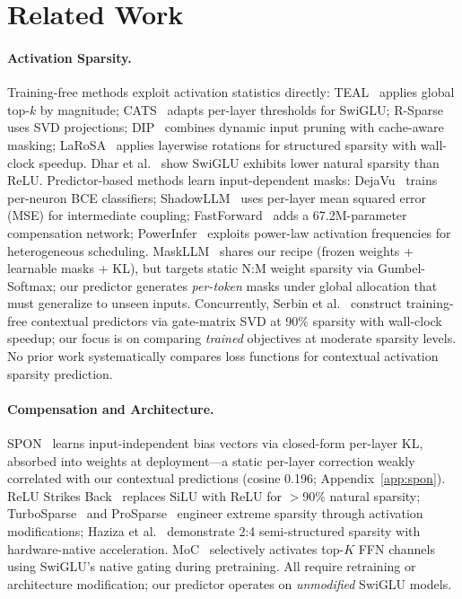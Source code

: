 \section{Related Work}

\paragraph{Activation Sparsity.}
Training-free methods exploit activation statistics directly: TEAL~\cite{liu2025teal} applies global top-$k$ by magnitude; CATS~\cite{lee2024cats} adapts per-layer thresholds for SwiGLU; R-Sparse~\cite{zhang2025rsparse} uses SVD projections; DIP~\cite{federici2025dip} combines dynamic input pruning with cache-aware masking; LaRoSA~\cite{liu2025larosa} applies layerwise rotations for structured sparsity with wall-clock speedup.
Dhar et al.~\cite{dhar2024activation} show SwiGLU exhibits lower natural sparsity than ReLU.
Predictor-based methods learn input-dependent masks: DejaVu~\cite{liu2023dejavu} trains per-neuron BCE classifiers; ShadowLLM~\cite{akhauri2024shadowllm} uses per-layer mean squared error (MSE) for intermediate coupling; FastForward~\cite{gautam2026fastforward} adds a 67.2M-parameter compensation network; PowerInfer~\cite{song2024powerinfer} exploits power-law activation frequencies for heterogeneous scheduling.
MaskLLM~\cite{fang2024maskllm} shares our recipe (frozen weights + learnable masks + KL), but targets static N:M weight sparsity via Gumbel-Softmax; our predictor generates \emph{per-token} masks under global allocation that must generalize to unseen inputs.
Concurrently, Serbin et al.~\cite{serbin2026svdcsp} construct training-free contextual predictors via gate-matrix SVD at 90\% sparsity with wall-clock speedup; our focus is on comparing \emph{trained} objectives at moderate sparsity levels.
No prior work systematically compares loss functions for contextual activation sparsity prediction.

\paragraph{Compensation and Architecture.}
SPON~\cite{xu2025spon} learns input-independent bias vectors via closed-form per-layer KL, absorbed into weights at deployment---a static per-layer correction weakly correlated with our contextual predictions (cosine 0.196; Appendix~\ref{app:spon}).
ReLU Strikes Back~\cite{mirzadeh2024relu} replaces SiLU with ReLU for $>$90\% natural sparsity; TurboSparse~\cite{song2024turbosparse} and ProSparse~\cite{song2025prosparse} engineer extreme sparsity through activation modifications; Haziza et al.~\cite{haziza2025accelerating} demonstrate 2:4 semi-structured sparsity with hardware-native acceleration.
MoC~\cite{wu2025moc} selectively activates top-$K$ FFN channels using SwiGLU's native gating during pretraining.
All require retraining or architecture modification; our predictor operates on \emph{unmodified} SwiGLU models.

